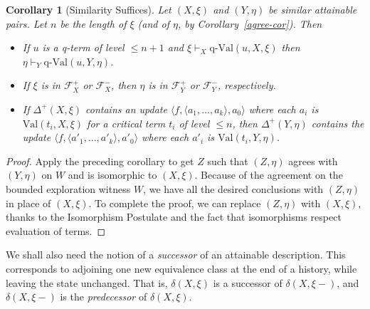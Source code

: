 \documentclass{LMCS}
\newtheorem{coro}[thm]{Corollary}
\theoremstyle{definition}
\newenvironment{ls}{\begin{itemize}}{\end{itemize}}
\newcommand{\DD}{\Delta^+}
\newcommand{\qval}[3]{\ensuremath{\text{q-Val}(#1,#2,#3)}}
\newcommand{\scr}[1]{\ensuremath{\mathcal {#1}}}
\newcommand{\sq}[1]{\ensuremath{\langle#1\rangle}}
\newcommand{\val}[3]{\ensuremath{\text{Val}(#1,#2,#3)}}
\begin{document}
\begin{coro}[Similarity Suffices]    \label{descr-suff}
Let $(X,\xi)$ and $(Y,\eta)$ be similar attainable pairs.   Let
$n$ be the length of $\xi$ (and of $\eta$, by
Corollary~\ref{agree-cor}). Then
\begin{ls}
\item If $u$ is a q-term of level $\leq n+1$ and $\xi\vdash_X\qval
uX\xi$
  then $\eta\vdash_Y\qval uY\eta$.
\item If $\xi$ is in $\scr F_X^+$ or $\scr F_X^-$, then $\eta$ is in
  $\scr F_Y^+$ or $\scr F_Y^-$, respectively.
\item If $\DD(X,\xi)$ contains an update \sq{f,\sq{a_1,\dots,a_k},a_0}
  where each $a_i$ is $\val{t_i}X\xi$ for a critical term $t_i$ of level $\leq
  n$, then $\DD(Y,\eta)$ contains the update
  \sq{f,\sq{a'_1,\dots,a'_k},a'_0} where each $a'_i$ is
  $\val{t_i}Y\eta$.
\end{ls}
\end{coro}

\begin{proof}
Apply the preceding corollary to get $Z$ such that $(Z,\eta)$
agrees with $(Y,\eta)$ on $W$ and is isomorphic to $(X,\xi)$.
Because of the agreement on the bounded exploration witness $W$,
we have all the desired conclusions with $(Z,\eta)$ in place of
$(X,\xi)$.  To complete the proof, we can replace $(Z,\eta)$ with
$(X,\xi)$, thanks to the Isomorphism Postulate and the fact that
isomorphisms respect evaluation of terms.
\end{proof}

We shall also need the notion of a \emph{successor} of an attainable
description.  This corresponds to adjoining one new equivalence class
at the end of a history, while leaving the state unchanged. That is,
$\delta(X,\xi)$ is a successor of $\delta(X,\xi-)$, and
$\delta(X,\xi-)$ is the \emph{predecessor} of $\delta(X,\xi)$.
\end{document}
